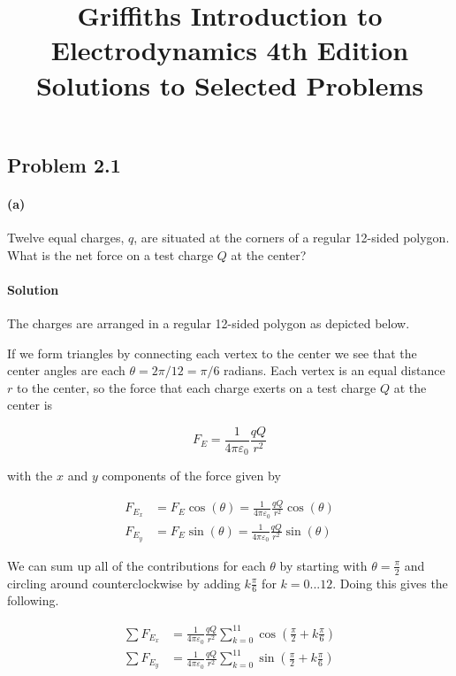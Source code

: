 \documentclass{article}
\title{Griffiths Introduction to Electrodynamics 4th Edition Solutions to Selected Problems}
\author{}
\date{}
\begin{document}
\maketitle

\newpage

\subsection*{Problem 2.1} 

\paragraph{(a)} Twelve equal charges, $q$, are situated at the corners of a regular 12-sided polygon. What is the net force on a test charge $Q$ at the center?

\paragraph{Solution} The charges are arranged in a regular 12-sided polygon as depicted below. 



If we form triangles by connecting each vertex to the center we see that the center angles are each $\theta = 2\pi / 12 = \pi/6$ radians.  Each vertex is an equal distance $r$ to the center, so the force that each charge exerts on a test charge $Q$ at the center is 

$$
F_E = \frac{1}{4\pi\varepsilon_0}\frac{qQ}{r^2}
$$

with the $x$ and $y$ components of the force given by 

\begin{align*}
    F_{E_x} &= F_E \cos(\theta) = \frac{1}{4\pi\varepsilon_0}\frac{qQ}{r^2} \cos(\theta) \\
    F_{E_y} &= F_E \sin(\theta) = \frac{1}{4\pi\varepsilon_0}\frac{qQ}{r^2} \sin(\theta)
\end{align*}

We can sum up all of the contributions for each $\theta$ by starting with $\theta = \frac{\pi}{2}$ and circling around counterclockwise by adding $k\frac{\pi}{6}$ for $k = 0...12$.  Doing this gives the following.

\begin{align*}
    \sum F_{E_x} &= \frac{1}{4\pi\varepsilon_0}\frac{qQ}{r^2} \sum_{k=0}
^{11} \cos(\frac{\pi}{2} + k\frac{\pi}{6})\\
\sum F_{E_y} &= \frac{1}{4\pi\varepsilon_0}\frac{qQ}{r^2} \sum_{k=0}
^{11} \sin(\frac{\pi}{2} + k\frac{\pi}{6})\\
\end{align*}
\end{document}
